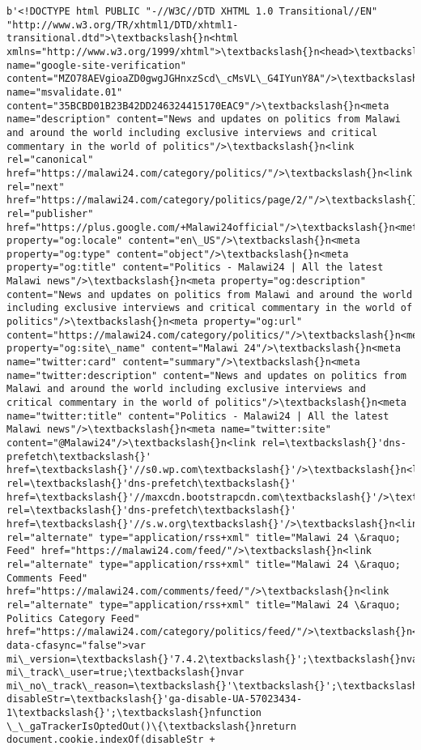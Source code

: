 \documentclass[11pt]{article}
\begin{document}
    \begin{Verbatim}[commandchars=\\\{\}]
b'<!DOCTYPE html PUBLIC "-//W3C//DTD XHTML 1.0 Transitional//EN" "http://www.w3.org/TR/xhtml1/DTD/xhtml1-transitional.dtd">\textbackslash{}n<html xmlns="http://www.w3.org/1999/xhtml">\textbackslash{}n<head>\textbackslash{}n<meta name="google-site-verification" content="MZO78AEVgioaZD0gwgJGHnxzScd\_cMsVL\_G4IYunY8A"/>\textbackslash{}n<meta name="msvalidate.01" content="35BCBD01B23B42DD246324415170EAC9"/>\textbackslash{}n<meta name="description" content="News and updates on politics from Malawi and around the world including exclusive interviews and critical commentary in the world of politics"/>\textbackslash{}n<link rel="canonical" href="https://malawi24.com/category/politics/"/>\textbackslash{}n<link rel="next" href="https://malawi24.com/category/politics/page/2/"/>\textbackslash{}n<link rel="publisher" href="https://plus.google.com/+Malawi24official"/>\textbackslash{}n<meta property="og:locale" content="en\_US"/>\textbackslash{}n<meta property="og:type" content="object"/>\textbackslash{}n<meta property="og:title" content="Politics - Malawi24 | All the latest Malawi news"/>\textbackslash{}n<meta property="og:description" content="News and updates on politics from Malawi and around the world including exclusive interviews and critical commentary in the world of politics"/>\textbackslash{}n<meta property="og:url" content="https://malawi24.com/category/politics/"/>\textbackslash{}n<meta property="og:site\_name" content="Malawi 24"/>\textbackslash{}n<meta name="twitter:card" content="summary"/>\textbackslash{}n<meta name="twitter:description" content="News and updates on politics from Malawi and around the world including exclusive interviews and critical commentary in the world of politics"/>\textbackslash{}n<meta name="twitter:title" content="Politics - Malawi24 | All the latest Malawi news"/>\textbackslash{}n<meta name="twitter:site" content="@Malawi24"/>\textbackslash{}n<link rel=\textbackslash{}'dns-prefetch\textbackslash{}' href=\textbackslash{}'//s0.wp.com\textbackslash{}'/>\textbackslash{}n<link rel=\textbackslash{}'dns-prefetch\textbackslash{}' href=\textbackslash{}'//maxcdn.bootstrapcdn.com\textbackslash{}'/>\textbackslash{}n<link rel=\textbackslash{}'dns-prefetch\textbackslash{}' href=\textbackslash{}'//s.w.org\textbackslash{}'/>\textbackslash{}n<link rel="alternate" type="application/rss+xml" title="Malawi 24 \&raquo; Feed" href="https://malawi24.com/feed/"/>\textbackslash{}n<link rel="alternate" type="application/rss+xml" title="Malawi 24 \&raquo; Comments Feed" href="https://malawi24.com/comments/feed/"/>\textbackslash{}n<link rel="alternate" type="application/rss+xml" title="Malawi 24 \&raquo; Politics Category Feed" href="https://malawi24.com/category/politics/feed/"/>\textbackslash{}n<script data-cfasync="false">var mi\_version=\textbackslash{}'7.4.2\textbackslash{}';\textbackslash{}nvar mi\_track\_user=true;\textbackslash{}nvar mi\_no\_track\_reason=\textbackslash{}'\textbackslash{}';\textbackslash{}nvar disableStr=\textbackslash{}'ga-disable-UA-57023434-1\textbackslash{}';\textbackslash{}nfunction \_\_gaTrackerIsOptedOut()\{\textbackslash{}nreturn document.cookie.indexOf(disableStr + 
\end{Verbatim}
\end{document}
